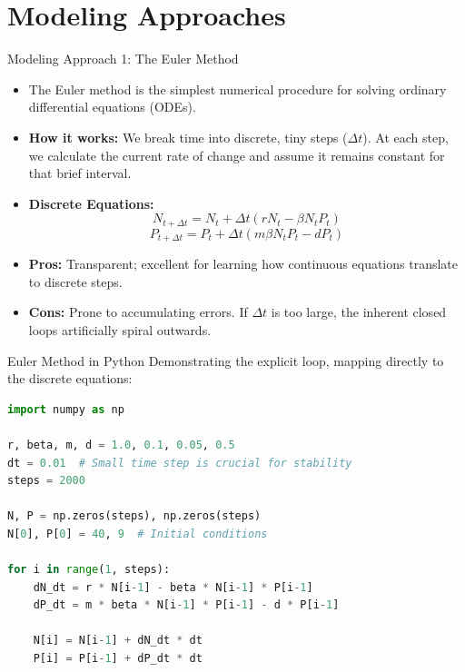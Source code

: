 \section{Modeling Approaches}

\begin{frame}{Modeling Approach 1: The Euler Method}
    \begin{itemize}
        \item The Euler method is the simplest numerical procedure for solving ordinary differential equations (ODEs).
        \vspace{0.5em}
        \item \textbf{How it works:} We break time into discrete, tiny steps ($\Delta t$). At each step, we calculate the current rate of change and assume it remains constant for that brief interval.
        \item \textbf{Discrete Equations:}
        \begin{equation}
            N_{t+\Delta t} = N_t + \Delta t (r N_t - \beta N_t P_t)
        \end{equation}
        \begin{equation}
            P_{t+\Delta t} = P_t + \Delta t (m \beta N_t P_t - d P_t)
        \end{equation}
        \vspace{0.5em}
        \item \textbf{Pros:} Transparent; excellent for learning how continuous equations translate to discrete steps.
        \item \textbf{Cons:} Prone to accumulating errors. If $\Delta t$ is too large, the inherent closed loops artificially spiral outwards.
    \end{itemize}
\end{frame}

\begin{frame}[fragile]{Euler Method in Python}
    \footnotesize
    Demonstrating the explicit loop, mapping directly to the discrete equations:
    \vspace{0.5em}
    \begin{lstlisting}[language=Python, basicstyle=\ttfamily\scriptsize, keywordstyle=\color{blue}, commentstyle=\color{gray}, frame=single]
import numpy as np

r, beta, m, d = 1.0, 0.1, 0.05, 0.5
dt = 0.01  # Small time step is crucial for stability
steps = 2000

N, P = np.zeros(steps), np.zeros(steps)
N[0], P[0] = 40, 9  # Initial conditions

for i in range(1, steps):
    dN_dt = r * N[i-1] - beta * N[i-1] * P[i-1]
    dP_dt = m * beta * N[i-1] * P[i-1] - d * P[i-1]
    
    N[i] = N[i-1] + dN_dt * dt
    P[i] = P[i-1] + dP_dt * dt
    \end{lstlisting}
\end{frame}

